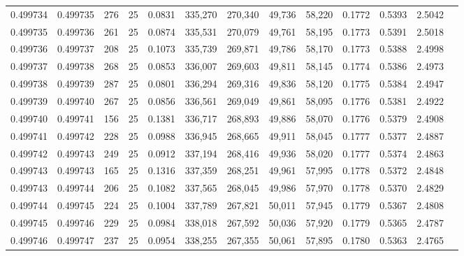 \begin{tabular}{rrrrrrrrrrrrr}
0.499734 & 0.499735 & 276 &  25 &                                     0.0831 & 335,270 & 270,340 &  49,736 &  58,220 & 0.1772 & 0.5393 & 2.5042 \\
0.499735 & 0.499736 & 261 &  25 &                                     0.0874 & 335,531 & 270,079 &  49,761 &  58,195 & 0.1773 & 0.5391 & 2.5018 \\
0.499736 & 0.499737 & 208 &  25 &                                     0.1073 & 335,739 & 269,871 &  49,786 &  58,170 & 0.1773 & 0.5388 & 2.4998 \\
0.499737 & 0.499738 & 268 &  25 &                                     0.0853 & 336,007 & 269,603 &  49,811 &  58,145 & 0.1774 & 0.5386 & 2.4973 \\
0.499738 & 0.499739 & 287 &  25 &                                     0.0801 & 336,294 & 269,316 &  49,836 &  58,120 & 0.1775 & 0.5384 & 2.4947 \\
0.499739 & 0.499740 & 267 &  25 &                                     0.0856 & 336,561 & 269,049 &  49,861 &  58,095 & 0.1776 & 0.5381 & 2.4922 \\
0.499740 & 0.499741 & 156 &  25 &                                     0.1381 & 336,717 & 268,893 &  49,886 &  58,070 & 0.1776 & 0.5379 & 2.4908 \\
0.499741 & 0.499742 & 228 &  25 &                                     0.0988 & 336,945 & 268,665 &  49,911 &  58,045 & 0.1777 & 0.5377 & 2.4887 \\
0.499742 & 0.499743 & 249 &  25 &                                     0.0912 & 337,194 & 268,416 &  49,936 &  58,020 & 0.1777 & 0.5374 & 2.4863 \\
0.499743 & 0.499743 & 165 &  25 &                                     0.1316 & 337,359 & 268,251 &  49,961 &  57,995 & 0.1778 & 0.5372 & 2.4848 \\
0.499743 & 0.499744 & 206 &  25 &                                     0.1082 & 337,565 & 268,045 &  49,986 &  57,970 & 0.1778 & 0.5370 & 2.4829 \\
0.499744 & 0.499745 & 224 &  25 &                                     0.1004 & 337,789 & 267,821 &  50,011 &  57,945 & 0.1779 & 0.5367 & 2.4808 \\
0.499745 & 0.499746 & 229 &  25 &                                     0.0984 & 338,018 & 267,592 &  50,036 &  57,920 & 0.1779 & 0.5365 & 2.4787 \\
0.499746 & 0.499747 & 237 &  25 &                                     0.0954 & 338,255 & 267,355 &  50,061 &  57,895 & 0.1780 & 0.5363 & 2.4765 \\

\end{tabular}
